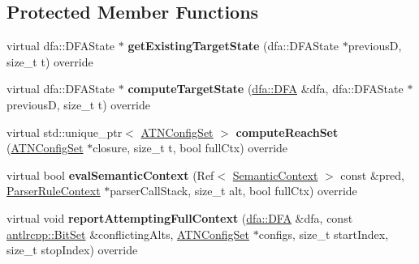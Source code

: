 \subsection*{Protected Member Functions}
\begin{DoxyCompactItemize}
\item 
\mbox{\label{classantlr4_1_1atn_1_1ProfilingATNSimulator_a2406132f5c14394f5b426d3bff44cf68}} 
virtual dfa\+::\+D\+F\+A\+State $\ast$ {\bfseries get\+Existing\+Target\+State} (dfa\+::\+D\+F\+A\+State $\ast$previousD, size\+\_\+t t) override
\item 
\mbox{\label{classantlr4_1_1atn_1_1ProfilingATNSimulator_a548b99a618c2943651df012ee670d12e}} 
virtual dfa\+::\+D\+F\+A\+State $\ast$ {\bfseries compute\+Target\+State} (\hyperlink{classantlr4_1_1dfa_1_1DFA}{dfa\+::\+D\+FA} \&dfa, dfa\+::\+D\+F\+A\+State $\ast$previousD, size\+\_\+t t) override
\item 
\mbox{\label{classantlr4_1_1atn_1_1ProfilingATNSimulator_aa2d28983d4cff6c1bcc5fd18afcb1119}} 
virtual std\+::unique\+\_\+ptr$<$ \hyperlink{classantlr4_1_1atn_1_1ATNConfigSet}{A\+T\+N\+Config\+Set} $>$ {\bfseries compute\+Reach\+Set} (\hyperlink{classantlr4_1_1atn_1_1ATNConfigSet}{A\+T\+N\+Config\+Set} $\ast$closure, size\+\_\+t t, bool full\+Ctx) override
\item 
\mbox{\label{classantlr4_1_1atn_1_1ProfilingATNSimulator_a225d742a50c68d84206fd93c87ffdfcb}} 
virtual bool {\bfseries eval\+Semantic\+Context} (Ref$<$ \hyperlink{classantlr4_1_1atn_1_1SemanticContext}{Semantic\+Context} $>$ const \&pred, \hyperlink{classantlr4_1_1ParserRuleContext}{Parser\+Rule\+Context} $\ast$parser\+Call\+Stack, size\+\_\+t alt, bool full\+Ctx) override
\item 
\mbox{\label{classantlr4_1_1atn_1_1ProfilingATNSimulator_a8e6287c59cd670e368fbe478ba9886e4}} 
virtual void {\bfseries report\+Attempting\+Full\+Context} (\hyperlink{classantlr4_1_1dfa_1_1DFA}{dfa\+::\+D\+FA} \&dfa, const \hyperlink{classantlrcpp_1_1BitSet}{antlrcpp\+::\+Bit\+Set} \&conflicting\+Alts, \hyperlink{classantlr4_1_1atn_1_1ATNConfigSet}{A\+T\+N\+Config\+Set} $\ast$configs, size\+\_\+t start\+Index, size\+\_\+t stop\+Index) override

\end{DoxyCompactItemize}

